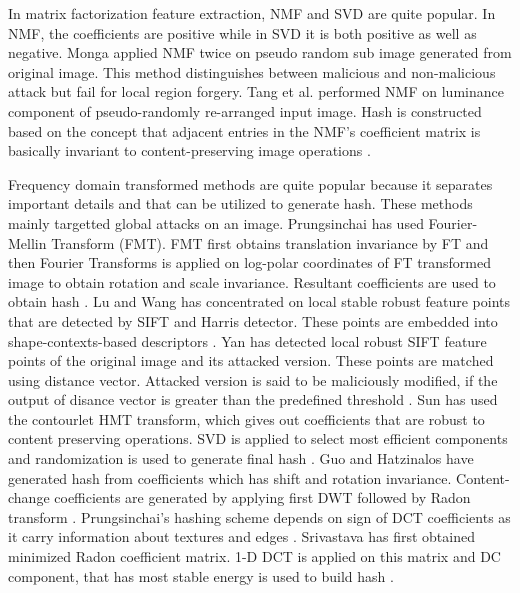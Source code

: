 \documentclass[12pt,a4paper]{jihmsp}
\begin{document}
{{In matrix factorization feature extraction, NMF and SVD are quite popular. In NMF, the coefficients are positive while in SVD it is both positive as well as negative. Monga applied NMF twice on pseudo random sub image generated from  original image. This method distinguishes between malicious and non-malicious attack but fail for local region forgery\cite{monga2007}. Tang et al. performed NMF on luminance component of pseudo-randomly re-arranged input image. Hash is constructed based on the concept that adjacent entries in the NMF’s coefficient matrix is basically invariant to content-preserving image operations \cite{tang2008}.
\par
Frequency domain transformed methods are quite popular because it separates important details and that can be utilized to generate hash. These methods mainly targetted global attacks on an image. Prungsinchai has used Fourier-Mellin Transform (FMT). FMT first obtains translation invariance by FT and then Fourier Transforms is applied on log-polar coordinates of FT transformed image to obtain rotation and scale invariance. Resultant coefficients are used to obtain hash \cite{prungsinchai2013a}. Lu and Wang has concentrated on local stable robust feature points that are detected by SIFT and Harris detector. These points are embedded into shape-contexts-based descriptors \cite{lu2012}. Yan has detected local robust SIFT feature points of the original image and its attacked version. These points are matched using distance vector. Attacked version is said to be maliciously modified, if the output of disance vector is greater than the predefined threshold \cite{yan2015}. Sun has used the contourlet HMT transform, which gives out coefficients that are robust to content preserving operations. SVD is applied to select most efficient components and randomization is used to generate final hash \cite{sun2011}. Guo and Hatzinalos have generated hash from coefficients which has shift and rotation invariance. Content-change coefficients are generated by applying first DWT followed by Radon transform \cite{guo2007}. Prungsinchai's hashing scheme depends on sign of DCT coefficients as it carry information about textures and edges \cite{prungsinchai2013b}. Srivastava has first obtained minimized Radon coefficient matrix. 1-D DCT is applied on this matrix and DC component, that has most stable energy is used to build hash \cite{srivastava2016}.
\par
}}
\end{document}
